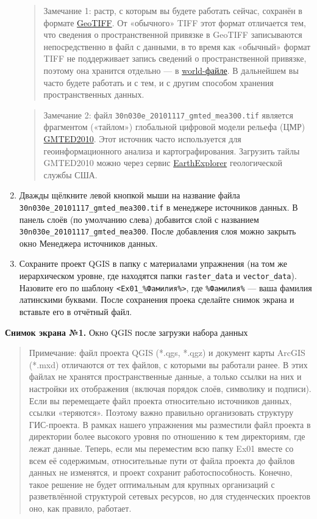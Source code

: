 \documentclass[
  12pt,
]{book}
\begin{document}
\begin{enumerate}
  \begin{quote}
  Замечание 1: растр, с которым вы будете работать сейчас, сохранён в формате \href{https://www.opengeospatial.org/standards/geotiff}{GeoTIFF}. От «обычного» TIFF этот формат отличается тем, что сведения о пространственной привязке в GeoTIFF записываются непосредственно в файл с данными, в то время как «обычный» формат TIFF не поддерживает запись сведений о пространственной привязке, поэтому она хранится отдельно --- в \href{https://en.wikipedia.org/wiki/World_file}{world-файле}. В дальнейшем вы часто будете работать и с тем, и с другим способом хранения пространственных данных.
  \end{quote}

  \begin{quote}
  Замечание 2: файл \texttt{30n030e\_20101117\_gmted\_mea300.tif} является фрагментом («тайлом») глобальной цифровой модели рельефа (ЦМР) \href{https://www.usgs.gov/land-resources/eros/coastal-changes-and-impacts/gmted2010}{GMTED2010}. Этот источник часто используется для геоинформационного анализа и картографирования. Загрузить тайлы GMTED2010 можно через сервис \href{https://earthexplorer.usgs.gov/}{EarthExplorer} геологической службы США.
  \end{quote}
\item
  Дважды щёлкните левой кнопкой мыши на название файла \texttt{30n030e\_20101117\_gmted\_mea300.tif} в менеджере источников данных. В панель слоёв (по умолчанию слева) добавится слой с названием \texttt{30n030e\_20101117\_gmted\_mea300}. После добавления слоя можно закрыть окно Менеджера источников данных.
\item
  Сохраните проект QGIS в папку с материалами упражнения (на том же иерархическом уровне, где находятся папки \texttt{raster\_data} и \texttt{vector\_data}). Назовите его по шаблону \texttt{\textless{}Ex01\_\%Фамилия\%\textgreater{}}, где \texttt{\%Фамилия\%} --- ваша фамилия латинскими буквами. После сохранения проека сделайте снимок экрана и вставьте его в отчётный файл.
\end{enumerate}

\textbf{Снимок экрана №1.} Окно QGIS после загрузки набора данных

\begin{quote}
Примечание: файл проекта QGIS (*.qgs, *.qgz) и документ карты ArcGIS (*.mxd) отличаются от тех файлов, с которыми вы работали ранее. В этих файлах не хранятся пространственные данные, а только ссылки на них и настройки их отображения (включая порядок слоёв, символику и подписи). Если вы перемещаете файл проекта относительно источников данных, ссылки «теряются». Поэтому важно правильно организовать структуру ГИС-проекта. В рамках нашего упражнения мы разместили файл проекта в директории более высокого уровня по отношению к тем директориям, где лежат данные. Теперь, если мы переместим всю папку Ex01 вместе со всем её содержимым, относительные пути от файла проекта до файлов данных не изменятся, и проект сохранит работоспособность. Конечно, такое решение не будет оптимальным для крупных организаций с разветвлённой структурой сетевых ресурсов, но для студенческих проектов оно, как правило, работает.
\end{quote}
\end{document}
